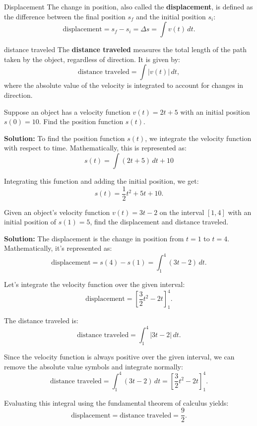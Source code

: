 \documentclass[12pt]{article}
\theoremstyle{beautifulthm}
\begin{document}
\begin{mytheorem}{Displacement}{}
    The change in position, also called the \textbf{displacement}, is defined as the difference between the final position $s_f$ and the initial position $s_i$:
\[
\text{displacement} = s_f - s_i = \Delta s = \int v(t) \, dt.
\]
\end{mytheorem}



\begin{mytheorem}{distance traveled}{}
The \textbf{distance traveled} measures the total length of the path taken by the object, regardless of direction. It is given by:
\[
\text{distance traveled} = \int |v(t)| \, dt,
\]
where the absolute value of the velocity is integrated to account for changes in direction.
\end{mytheorem}

\begin{tcolorbox}[colback=examplebg, colframe=red!75!black, title=\textbf{EXAMPLE 1: Position }, fonttitle=\bfseries, sharp corners]
Suppose an object has a velocity function $v(t) = 2t + 5$ with an initial position $s(0) = 10$. Find the position function $s(t)$.


\tcblower
\textbf{Solution:} 
 To find the position function $s(t)$, we integrate the velocity function with respect to time. Mathematically, this is represented as:
\[
s(t) = \int (2t + 5) \, dt + 10
\]

Integrating this function and adding the initial position, we get:
\[
s(t) = \frac{1}{2}t^2 + 5t + 10.
\]
\end{tcolorbox}



\begin{tcolorbox}[colback=examplebg, colframe=red!75!black, title=\textbf{EXAMPLE 2: Displacement \& Distance}, fonttitle=\bfseries, sharp corners]

Given an object's velocity function $v(t) = 3t - 2$ on the interval $[1, 4]$ with an initial position of $s(1) = 5$, find the displacement and distance traveled.

\tcblower
\textbf{Solution:} 
The displacement is the change in position from $t = 1$ to $t = 4$. Mathematically, it's represented as:
\[
\text{displacement} = s(4) - s(1) = \int_{1}^{4} (3t - 2) \, dt.
\]

Let's integrate the velocity function over the given interval:
\[
\text{displacement} = \left[ \frac{3}{2}t^2 - 2t \right]_1^4.
\]

The distance traveled is:
\[
\text{distance traveled} = \int_{1}^{4} |3t - 2| \, dt.
\]

Since the velocity function is always positive over the given interval, we can remove the absolute value symbols and integrate normally:
\[
\text{distance traveled} = \int_{1}^{4} (3t - 2) \, dt = \left[ \frac{3}{2}t^2 - 2t \right]_1^4.
\]

Evaluating this integral using the fundamental theorem of calculus yields:
\[
\text{displacement} = \text{distance traveled} = \frac{9}{2}.
\]
\end{tcolorbox}
\end{document}
